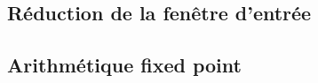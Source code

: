 \documentclass{article}
\begin{document}




    \subsection{Réduction de la fenêtre d'entrée}
    \subsection{Arithmétique fixed point}



\end{document}

